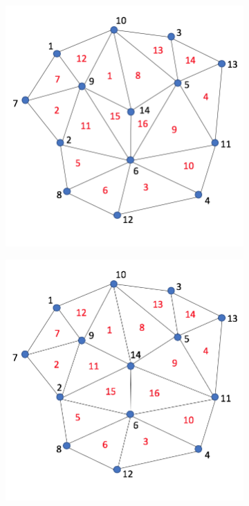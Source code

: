 \documentclass{article}
\begin{document}
\begin{figure}[H]
\begin{subfigure}[b]{0.4\linewidth}
    \caption{}
  \end{subfigure}
  \begin{subfigure}[b]{0.4\linewidth}
    \includegraphics[width=\linewidth]{Fig_split_triangle_03.png}
    \caption{}
  \end{subfigure}
  \begin{subfigure}[b]{0.4\linewidth}
    \includegraphics[width=\linewidth]{Fig_split_triangle_04.png}

\end{subfigure}
\end{figure}
\end{document}
